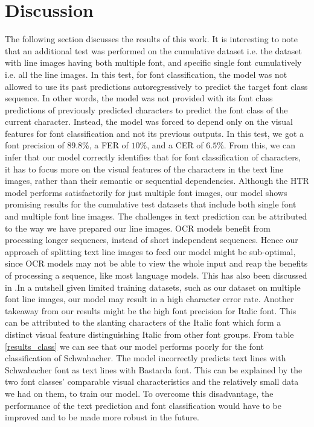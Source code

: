 \documentclass[conference]{IEEEtran}
\begin{document}
\section{Discussion}\label{discussion}
The following section discusses the results of this work. It is interesting to note that an additional test was performed on the cumulative dataset i.e. the dataset with line images having both multiple font, and specific single font cumulatively i.e. all the line images. In this test, for font classification, the model was not allowed to use its past predictions autoregressively to predict the target font class sequence. In other words, the model was not provided with its font class predictions of previously predicted characters to predict the font class of the current character. Instead, the model was forced to depend only on the visual features for font classification and not its previous outputs. In this test, we got a font precision of $89.8$\%, a FER of $10$\%, and a CER of $6.5$\%. From this, we can infer that our model correctly identifies that for font classification of characters, it has to focus more on the visual features of the characters in the text line images, rather than their semantic or sequential dependencies.\newline  
Although the HTR model performs satisfactorily for just multiple font images, our model shows promising results for the cumulative test datasets that include both single font and multiple font line images. The challenges in text prediction can be attributed to the way we have prepared our line images. OCR models benefit from processing longer sequences, instead of short independent sequences. Hence our approach of splitting text line images to feed our model might be sub-optimal, since OCR models may not be able to view the whole input and reap the benefits of processing a sequence, like most language models. This has also been discussed in \cite{faucris.312972480}.In a nutshell given limited training datasets, such as our dataset on multiple font line images, our model may result in a high character error rate. Another takeaway from our results might be the high font precision for Italic font. This can be attributed to the slanting characters of the Italic font which form a distinct visual feature distinguishing Italic from other font groups. From table \ref{results_class} we can see that our model performs poorly for the font classification of Schwabacher. The model incorrectly predicts text lines with Schwabacher font as text lines with Bastarda font. This can be explained by the two font classes' comparable visual characteristics and the relatively small data we had on them, to train our model.  To overcome this disadvantage, the performance of the text prediction and font classification would have to be improved and to be made more robust in the future.
\end{document}
